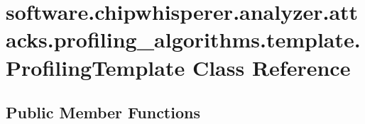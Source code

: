 \hypertarget{classsoftware_1_1chipwhisperer_1_1analyzer_1_1attacks_1_1profiling__algorithms_1_1template_1_1ProfilingTemplate}{}\section{software.\+chipwhisperer.\+analyzer.\+attacks.\+profiling\+\_\+algorithms.\+template.\+Profiling\+Template Class Reference}
\label{classsoftware_1_1chipwhisperer_1_1analyzer_1_1attacks_1_1profiling__algorithms_1_1template_1_1ProfilingTemplate}
\subsection*{Public Member Functions}

